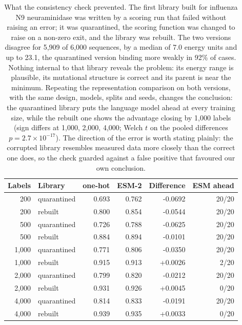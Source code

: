 \documentclass[11pt,a4paper]{article}
\begin{document}
\begin{table}[h]
\caption{What the consistency check prevented. The first library built for influenza N9 neuraminidase was written by a scoring run that failed without raising an error; it was quarantined, the scoring function was changed to raise on a non-zero exit, and the library was rebuilt. The two versions disagree for 5,909 of 6,000 sequences, by a median of 7.0 energy units and up to 23.1, the quarantined version binding more weakly in 92\% of cases. Nothing internal to that library reveals the problem: its energy range is plausible, its mutational structure is correct and its parent is near the minimum. Repeating the representation comparison on both versions, with the same design, models, splits and seeds, changes the conclusion: the quarantined library puts the language model ahead at every training size, while the rebuilt one shows the advantage closing by 1,000 labels (sign differs at 1,000, 2,000, 4,000; Welch $t$ on the pooled differences $p = 2.7\times10^{-17}$). The direction of the error is worth stating plainly: the corrupted library resembles measured data more closely than the correct one does, so the check guarded against a false positive that favoured our own conclusion.}
\centering
\begin{tabular}{@{}rlrrrr@{}}
\toprule
Labels & Library & one-hot & ESM-2 & Difference & ESM ahead \\
\midrule
200 & quarantined & 0.693 & 0.762 & -0.0692 & 20/20 \\
200 & rebuilt & 0.800 & 0.854 & -0.0544 & 20/20 \\
500 & quarantined & 0.726 & 0.788 & -0.0625 & 20/20 \\
500 & rebuilt & 0.884 & 0.894 & -0.0101 & 20/20 \\
1,000 & quarantined & 0.771 & 0.806 & -0.0350 & 20/20 \\
1,000 & rebuilt & 0.915 & 0.913 & +0.0026 & 2/20 \\
2,000 & quarantined & 0.799 & 0.820 & -0.0212 & 20/20 \\
2,000 & rebuilt & 0.931 & 0.926 & +0.0045 & 0/20 \\
4,000 & quarantined & 0.814 & 0.833 & -0.0191 & 20/20 \\
4,000 & rebuilt & 0.939 & 0.935 & +0.0033 & 0/20 \\
\bottomrule
\end{tabular}
\end{table}
\end{document}
